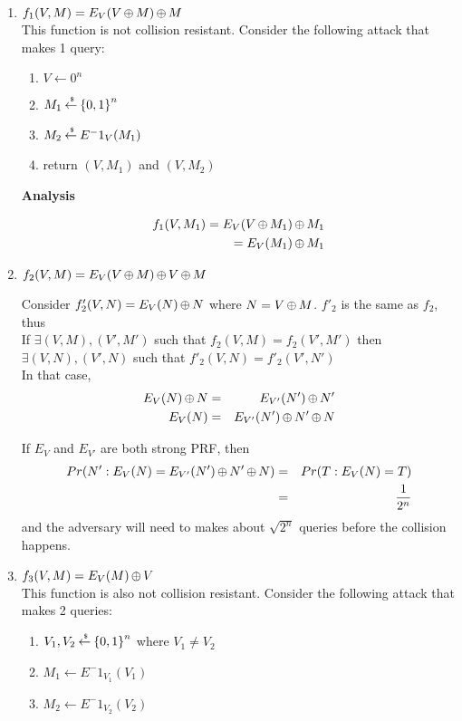 \documentclass[11pt]{article}
\begin{document}
\begin{enumerate}
\item $f_1(V,M) = E_V(V {\,\oplus\,} M) {\,\oplus\,} M $\\

This function is not collision resistant. Consider the following attack that makes 1 query:\\
\begin{enumerate}
\item $V \gets 0^n$
\item $M_1 {\:\stackrel{{\scriptscriptstyle \hspace{0.2em}\$}} {\leftarrow}\:} {\{0,1\}}^n$
\item $M_2 {\:\stackrel{{\scriptscriptstyle \hspace{0.2em}\$}} {\leftarrow}\:} E^-1_V(M_1)$
\item return $(V, M_1)$ and $(V, M_2)$
\end{enumerate}

\textbf{Analysis}

\begin{eqnarray*}
f_1(V, M_1) = E_V(V {\,\oplus\,} M_1) {\,\oplus\,} M_1\\
=E_V(M_1) {\,\oplus\,} M_1
\end{eqnarray*}

\item $f_2(V,M) = E_V(V {\,\oplus\,} M) {\,\oplus\,} V {\,\oplus\,} M$

Consider $f'_2(V,N)=E_V(N) {\,\oplus\,} N$ where $N=V {\,\oplus\,} M$. $f'_2$ is the same as $f_2$, thus\\If $\exists (V, M), (V', M')$ such that $f_2(V,M)=f_2(V', M')$ then\\ $\exists (V, N), (V', N)$ such that $f'_2(V,N)=f'_2(V', N')$\\

In that case,\\
\begin{eqnarray*}
E_V(N) {\,\oplus\,} N &=& E_{V'}(N') {\,\oplus\,} N'\\
E_V(N)&=& E_{V'}(N') {\,\oplus\,} N' {\,\oplus\,} N\\
\end{eqnarray*}

If $E_V$ and $E_{V'}$ are both strong PRF, then 
\begin{eqnarray*}
Pr(N': E_V(N)= E_{V'}(N') {\,\oplus\,} N' {\,\oplus\,} N)&=&Pr(T: E_V(N)=T)\\
&=&\frac{1}{2^n}
\end{eqnarray*}
and the adversary will need to makes about $\sqrt{2^n}$ queries before the collision happens.
\item $f_3(V,M) = E_V(M) {\,\oplus\,} V$
\\This function is also not collision resistant. Consider the following attack that makes 2 queries:\\
\begin{enumerate}
\item $V_1, V_2 {\:\stackrel{{\scriptscriptstyle \hspace{0.2em}\$}} {\leftarrow}\:} {\{0,1\}}^n$ where $V_1 \neq V_2$\\
\item $M_1 \gets E^-1_{V_1}(V_1)$\\
\item $M_2 \gets E^-1_{V_2}(V_2)$\\
\end{enumerate}


\end{enumerate}
\end{document}

